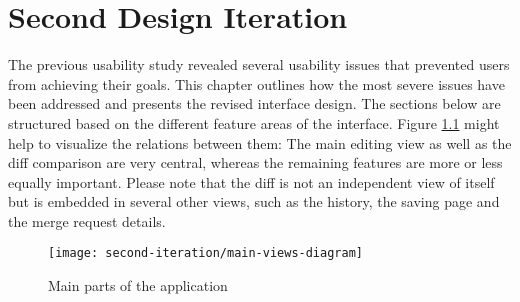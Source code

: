 \chapter{Second Design Iteration} \label{chapter:design-second-iteration}
The previous usability study revealed several usability issues that prevented users from achieving their goals. This chapter outlines how the most severe issues have been addressed and presents the revised interface design. The sections below are structured based on the different feature areas of the interface. Figure \ref{fig:main-views-diagram} might help to visualize the relations between them: The main editing view as well as the diff comparison are very central, whereas the remaining features are more or less equally important. Please note that the diff is not an independent view of itself but is embedded in several other views, such as the history, the saving page and the merge request details.
 
\begin{figure}[h!]
 \centering
 \texttt{[image: second-iteration/main-views-diagram]}
 \caption{Main parts of the application}
 \label{fig:main-views-diagram}
\end{figure}





